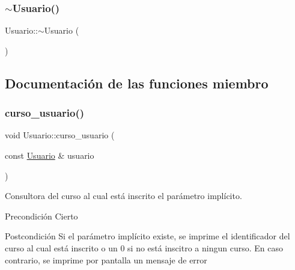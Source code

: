 \mbox{\label{class_usuario_ab4096b0b8300ecb47b10c555fb09c997}} 
\subsubsection{\texorpdfstring{$\sim$\+Usuario()}{~Usuario()}}
{\footnotesize\ttfamily Usuario\+::$\sim$\+Usuario (\begin{DoxyParamCaption}{ }\end{DoxyParamCaption})}



\subsection{Documentación de las funciones miembro}
\mbox{\label{class_usuario_a5c6a46acdcb1397ba7600e7b97493e4a}} 
\subsubsection{\texorpdfstring{curso\+\_\+usuario()}{curso\_usuario()}}
{\footnotesize\ttfamily void Usuario\+::curso\+\_\+usuario (\begin{DoxyParamCaption}\item[{const \mbox{\hyperlink{class_usuario}{Usuario}} \&}]{usuario }\end{DoxyParamCaption})}



Consultora del curso al cual está inscrito el parámetro implícito. 

\begin{DoxyPrecond}{Precondición}
Cierto 
\end{DoxyPrecond}
\begin{DoxyPostcond}{Postcondición}
Si el parámetro implícito existe, se imprime el identificador del curso al cual está inscrito o un 0 si no está inscitro a ningun curso. En caso contrario, se imprime por pantalla un mensaje de error 
\end{DoxyPostcond}
\mbox{\label{class_usuario_a2643a5c29f64aab2c531f78d2618e891}} 
